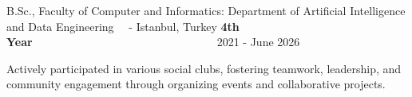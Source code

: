 

\begin{cventries}

    
  \cventry
    {B.Sc., Faculty of Computer and Informatics: Department of Artificial Intelligence and Data Engineering \ \ -} %
    {\href{https://www.itu.edu.tr/}{}} %
    {Istanbul, Turkey} %
    {\textbf{4th Year}\ \ \ \ \ \ \ \ \ \ \ \ \ \ \ \ \ \ \ \ \ \ \ \ \ \ \ \ \ \ \ \ \ 2021 - June 2026} %
    {
      \begin{cvitems} %
        \item {Actively participated in various social clubs, fostering teamwork, leadership, and community engagement through organizing events and collaborative projects.} 
      \end{cvitems}
    }


\end{cventries}